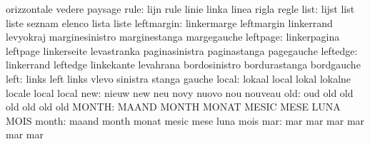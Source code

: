                            orizzontale               vedere
                           paysage
                     rule: lijn                      rule
                           linie                     linka
                           linea                     rigla
                           regle
                     list: lijst                     list
                           liste                     seznam
                           elenco                    lista
                           liste
               leftmargin: linkermarge               leftmargin
                           linkerrand                levyokraj
                           marginesinistro           marginestanga
                           margegauche
                 leftpage: linkerpagina              leftpage
                           linkerseite               levastranka
                           paginasinistra            paginastanga
                           pagegauche
                 leftedge: linkerrand                leftedge
                           linkekante                levahrana
                           bordosinistro             bordurastanga
                           bordgauche
                     left: links                     left
                           links                     vlevo
                           sinistra                  stanga
                           gauche
                    local: lokaal                    local
                           lokal                     lokalne
                           locale                    local
                           local
                      new: nieuw                     new
                           neu                       novy
                           nuovo                     nou
                           nouveau
                      old: oud                       old
                           old                       old
                           old                       old
                           old
                    MONTH: MAAND                     MONTH
                           MONAT                     MESIC
                           MESE                      LUNA
                           MOIS
                    month: maand                     month
                           monat                     mesic
                           mese                      luna
                           mois
                      mar: mar                       mar
                           mar                       mar
                           mar                       mar
